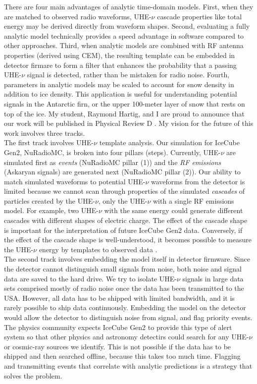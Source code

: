 \documentclass[../../../main.tex]{subfiles}
\begin{document}
There are four main advantages of analytic time-domain models. First, when they are matched to observed radio waveforms, UHE-$\nu$ cascade properties like total energy may be derived directly from waveform shapes. Second, evaluating a fully analytic model technically provides a speed advantage in software compared to other approaches. Third, when analytic models are combined with RF antenna properties (derived using CEM), the resulting template can be embedded in detector firmare to form a filter that enhances the probability that a passing UHE-$\nu$ signal is detected, rather than be mistaken for radio noise. Fourth, parameters in analytic models may be scaled to account for snow density in addition to ice density. This application is useful for understanding potential signals in the Antarctic firn, or the upper 100-meter layer of snow that rests on top of the ice.  My student, Raymond Hartig, and I are proud to announce that our work will be published in Physical Review D \cite{time}.  My vision for the future of this work involves three tracks.
\\
\vspace{0.25cm}
The first track involves UHE-$\nu$ template analysis.  Our simulation for IceCube Gen2, NuRadioMC, is broken into four pillars (steps).  Currently, UHE-$\nu$ are simulated first as \textit{events} (NuRadioMC pillar (1)) and the \textit{RF emissions} (Askaryan signals) are generated next (NuRadioMC pillar (2)).  Our ability to match simulated waveforms to potential UHE-$\nu$ waveforms from the detector is limited because we cannot scan through properties of the simulated \textit{cascades} of particles created by the UHE-$\nu$, only the UHE-$\nu$ with a single RF emissions model.  For example, two UHE-$\nu$ with the same energy could generate different cascades with different shapes of electric charge.  The effect of the cascade shape is important for the interpretation of future IceCube Gen2 data.  Conversely, if the effect of the cascade shape is well-understood, it becomes possible to measure the UHE-$\nu$ energy by templates to observed data \cite{time}.
\\
\vspace{0.25cm}
The second track involves embedding the model itself in detector firmware.  Since the detector cannot distinguish small signals from noise, both noise and signal data are saved to the hard drive.  We try to isolate UHE-$\nu$ signals in large data sets comprised mostly of radio noise once the data has been transmitted to the USA.  However, all data has to be shipped with limited bandwidth, and it is rarely possible to ship data continuously.  Embedding the model on the detector would allow the detector to distinguish noise from signal, and flag priority events.  The physics community expects IceCube Gen2 to provide this type of alert system so that other physics and astronomy detectirs could search for any UHE-$\nu$ or cosmic-ray sources we identify.  This is not possible if the data has to be shipped and then searched offline, because this takes too much time.  Flagging and transmitting events that correlate with analytic predictions is a strategy that solves the problem.
\end{document}
